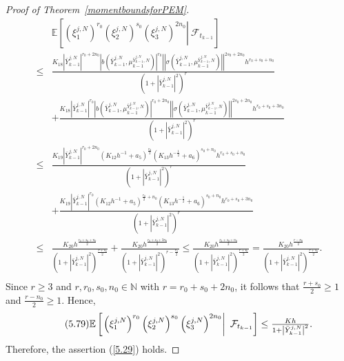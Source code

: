 \documentclass[12pt]{article}
\numberwithin{equation}{section}
\begin{document}
\begin{proof}[Proof of Theorem~\ref{momentboundsforPEM}]
\begin{equation}\tag{5.78}\label{5.31}
\begin{aligned}
&\mathbb{E} \left[\left. \left( \xi _{1}^{j,N} \right) ^{r_0}\left( \xi _{2}^{j,N} \right) ^{s_0}\left( \xi _{3}^{j,N} \right) ^{2n_0}\right\rvert\ \mathcal{F} _{t_{k-1}} \right] 
\\
\le& \tfrac{K_{18}\left| \bar{Y}_{k-1}^{j,N} \right|^{r_0+2n_0}\left| b\left( \bar{Y}_{k-1}^{j,N},\mu _{k-1}^{\bar{Y}_{k-1}^{j,N},N} \right) \right|^{r_0}\left|\left| \sigma \left( \bar{Y}_{k-1}^{j,N},\mu _{k-1}^{\bar{Y}_{k-1}^{j,N},N} \right) \right|\right| ^{2s_0+2n_0}h^{r_0+s_0+n_0}}{\left( 1+\left| \bar{Y}_{k-1}^{j,N} \right|^2 \right) ^r}
\\
&+\tfrac{K_{18}\left| \bar{Y}_{k-1}^{j,N} \right|^{r_0}\left| b\left( \bar{Y}_{k-1}^{j,N},\mu _{k-1}^{\bar{Y}_{k-1}^{j,N},N} \right) \right|^{r_0+2n_0}\left|\left| \sigma \left( \bar{Y}_{k-1}^{j,N},\mu _{k-1}^{\bar{Y}_{k-1}^{j,N},N} \right) \right|\right| ^{2s_0+2n_0}h^{r_0+s_0+3n_0}}{\left( 1+\left| \bar{Y}_{k-1}^{j,N} \right|^2 \right) ^r}
\\
\le& \tfrac{K_{19}\left| \bar{Y}_{k-1}^{j,N} \right|^{r_0+2n_0}\left( K_{12}h^{-1}+a_5 \right) ^{\frac{r_0}{2}}\left( K_{13}h^{-\frac{1}{2}}+a_6 \right) ^{s_0+n_0}h^{r_0+s_0+n_0}}{\left( 1+\left| \bar{Y}_{k-1}^{j,N} \right|^2 \right) ^r}
\\
&+\tfrac{K_{19}\left| \bar{Y}_{k-1}^{j,N} \right|^{r_0}\left( K_{12}h^{-1}+a_5 \right) ^{\frac{r_0}{2}+n_0}\left( K_{13}h^{-\frac{1}{2}}+a_6 \right) ^{s_0+n_0}h^{r_0+s_0+3n_0}}{\left( 1+\left| \bar{Y}_{k-1}^{j,N} \right|^2 \right) ^r}
\\
\le& \tfrac{K_{20}h^{\frac{r_0+s_0+n_0}{2}}}{\left( 1+\left| \bar{Y}_{k-1}^{j,N} \right|^2 \right) ^{\frac{r+s_0}{2}}}+\tfrac{K_{20}h^{\frac{r_0+s_0+3n_0}{2}}}{\left( 1+\left| \bar{Y}_{k-1}^{j,N} \right|^2 \right) ^{r-\frac{r_0}{2}}}
\le  \tfrac{K_{20}h^{\frac{r_0+s_0+n_0}{2}}}{\left( 1+\left| \bar{Y}_{k-1}^{j,N} \right|^2 \right) ^{\frac{r+s_0}{2}}}
= \tfrac{K_{20}h^{\frac{r-n_0}{2}}}{\left( 1+\left| \bar{Y}_{k-1}^{j,N} \right|^2 \right) ^{\frac{r+s_0}{2}}}.\\
\end{aligned}
\end{equation}
Since $ r \geq 3 $ and $ r, r_0, s_0, n_0 \in \mathbb{N} $ with $ r = r_0 + s_0 + 2n_0 $, it follows that $ \tfrac{r + s_0}{2} \geq 1 $ and $ \tfrac{r - n_0}{2} \geq 1 $. Hence, 
\begin{equation}\tag{5.79}\label{5.32}
\mathbb{E} \left[\left. \left( \xi _{1}^{j,N} \right) ^{r_0}\left( \xi _{2}^{j,N} \right) ^{s_0}\left( \xi _{3}^{j,N} \right) ^{2n_0}\right\rvert\ \mathcal{F} _{t_{k-1}} \right] \le \tfrac{Kh}{1+\left|\bar{Y}_{k-1}^{j,N}\right|^2}.\\
\end{equation}
Therefore, the assertion (\ref{5.29}) holds. 


\end{proof}
\end{document}
